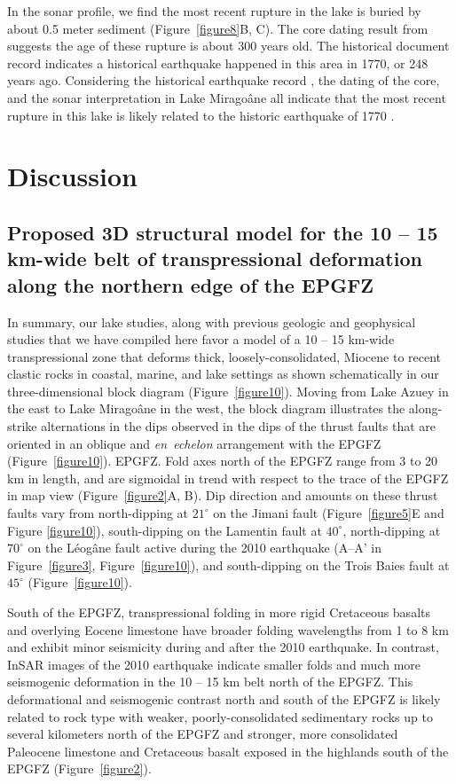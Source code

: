 \documentclass[linenumbers,draft]{agujournal}
\begin{document}
In the sonar profile, we find the most recent rupture in the lake is buried by about 0.5 meter sediment (Figure~\ref{figure8}B, C). The core dating result from \citet{higuera199910} suggests the age of these rupture is about 300 years old. The historical document record \citep{bakun2012significant} indicates a historical earthquake happened in this area in 1770, or 248 years ago. Considering the historical earthquake record \citep{bakun2012significant}, the dating of the core, and the sonar interpretation in Lake Mirago\^ane all indicate that the most recent rupture in this lake is likely related to the historic earthquake of 1770 \citep{bakun2012significant}.

\section{Discussion}
\subsection{Proposed 3D structural model for the 10 -- 15 km-wide belt of transpressional deformation along the northern edge of the EPGFZ}
In summary, our lake studies, along with previous geologic and geophysical studies that we have compiled here favor a model of a 10 -- 15 km-wide transpressional zone that deforms thick, loosely-consolidated, Miocene to recent clastic rocks in coastal, marine, and lake settings as shown schematically in our three-dimensional block diagram (Figure~\ref{figure10}). Moving from Lake Azuey in the east to Lake Mirago\^ane in the west, the block diagram illustrates the along-strike alternations in the dips observed in the dips of the thrust faults that are oriented in an oblique and \textit{en~echelon} arrangement with the EPGFZ (Figure~\ref{figure10}). EPGFZ. Fold axes north of the EPGFZ range from 3 to 20 km in length, and are sigmoidal in trend with respect to the trace of the EPGFZ in map view (Figure~\ref{figure2}A, B). Dip direction and amounts on these thrust faults vary from north-dipping at $21^{\circ}$ on the Jimani fault (Figure~\ref{figure5}E and Figure \ref{figure10}), south-dipping on the Lamentin fault \citep{saint2015seismotectonics} at $40^{\circ}$, north-dipping at $70^{\circ}$ on the L\'eog\^ane fault active during the 2010 earthquake (A--A' in Figure~\ref{figure3}, Figure~\ref{figure10}), and south-dipping on the Trois Baies fault at $45^{\circ}$ (Figure~\ref{figure10}). 

South of the EPGFZ, transpressional folding in more rigid Cretaceous basalts and overlying Eocene limestone have broader folding wavelengths from 1 to 8 km and exhibit minor seismicity during and after the 2010 earthquake. In contrast, InSAR images of the 2010 earthquake indicate smaller folds and much more seismogenic deformation in the 10 -- 15 km belt north of the EPGFZ. This deformational and seismogenic contrast north and south of the EPGFZ is likely related to rock type with weaker, poorly-consolidated sedimentary rocks up to several kilometers north of the EPGFZ and stronger, more consolidated Paleocene limestone and Cretaceous basalt exposed in the highlands south of the EPGFZ \citep{mann1991overview} (Figure~\ref{figure2}).
\end{document}
